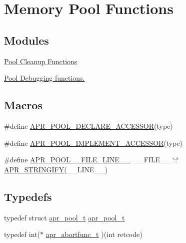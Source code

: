 \hypertarget{group__apr__pools}{\section{Memory Pool Functions}
\label{group__apr__pools}
}
\subsection*{Modules}
\begin{DoxyCompactItemize}
\item 
\hyperlink{group___pool_cleanup}{Pool Cleanup Functions}
\item 
\hyperlink{group___pool_debug}{Pool Debugging functions.}
\end{DoxyCompactItemize}
\subsection*{Macros}
\begin{DoxyCompactItemize}
\item 
\#define \hyperlink{group__apr__pools_ga89ce1d55c7f0c39ea87c88eabd655394}{A\-P\-R\-\_\-\-P\-O\-O\-L\-\_\-\-D\-E\-C\-L\-A\-R\-E\-\_\-\-A\-C\-C\-E\-S\-S\-O\-R}(type)
\item 
\#define \hyperlink{group__apr__pools_ga43a8a52f68f8b7d3b7694c254da4a074}{A\-P\-R\-\_\-\-P\-O\-O\-L\-\_\-\-I\-M\-P\-L\-E\-M\-E\-N\-T\-\_\-\-A\-C\-C\-E\-S\-S\-O\-R}(type)
\item 
\#define \hyperlink{group__apr__pools_gac81cff34d0ff4be52fa924663478eade}{A\-P\-R\-\_\-\-P\-O\-O\-L\-\_\-\-\_\-\-F\-I\-L\-E\-\_\-\-L\-I\-N\-E\-\_\-\-\_\-}~\-\_\-\-\_\-\-F\-I\-L\-E\-\_\-\-\_\- \char`\"{}\-:\char`\"{} \hyperlink{apr__version_8h_ae90215615972dfa4108018304361ef0b}{A\-P\-R\-\_\-\-S\-T\-R\-I\-N\-G\-I\-F\-Y}(\-\_\-\-\_\-\-L\-I\-N\-E\-\_\-\-\_\-)
\end{DoxyCompactItemize}
\subsection*{Typedefs}
\begin{DoxyCompactItemize}
\item 
typedef struct \hyperlink{group__apr__pools_gaf137f28edcf9a086cd6bc36c20d7cdfb}{apr\-\_\-pool\-\_\-t} \hyperlink{group__apr__pools_gaf137f28edcf9a086cd6bc36c20d7cdfb}{apr\-\_\-pool\-\_\-t}
\item 
typedef int($\ast$ \hyperlink{group__apr__pools_ga0a1fe549a7c45b864c003ddf12115365}{apr\-\_\-abortfunc\-\_\-t} )(int retcode)
\end{DoxyCompactItemize}
